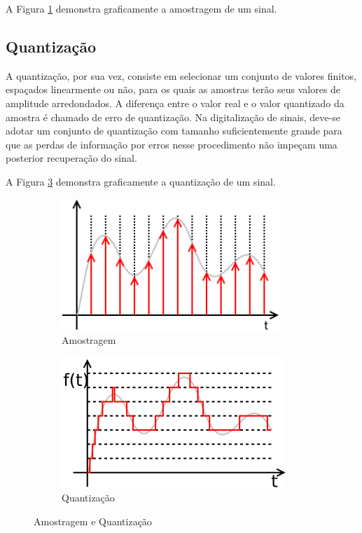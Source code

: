 A Figura \ref{fig-sampling} demonstra graficamente a amostragem de um sinal.


\subsection{Quantização}
A quantização, por sua vez, consiste em selecionar um conjunto de valores finitos, espaçados linearmente ou não, para os quais as amostras terão seus valores de amplitude arredondados. A diferença entre o valor real e o valor quantizado da amostra é chamado de erro de quantização. Na digitalização de sinais, deve-se adotar um conjunto de quantização com tamanho suficientemente grande para que as perdas de informação por erros nesse procedimento não impeçam uma posterior recuperação do sinal.


A Figura \ref{fig-quantizacao} demonstra graficamente a quantização de um sinal.

\begin{figure}[h]
	\begin{subfigure}{0.5\textwidth}
		\centering
		\includegraphics[scale=0.4]{pasta1_figuras/amostragem.png}
		\caption{Amostragem} \label{fig-sampling}
	\end{subfigure}
	\hspace*{\fill} %
	\begin{subfigure}{0.5\textwidth}
		\centering
		\includegraphics[scale=0.75]{pasta1_figuras/quantization.png}
		\caption{Quantização} \label{fig-quantizacao}
	\end{subfigure}
	\caption{Amostragem e Quantização}
\end{figure}

